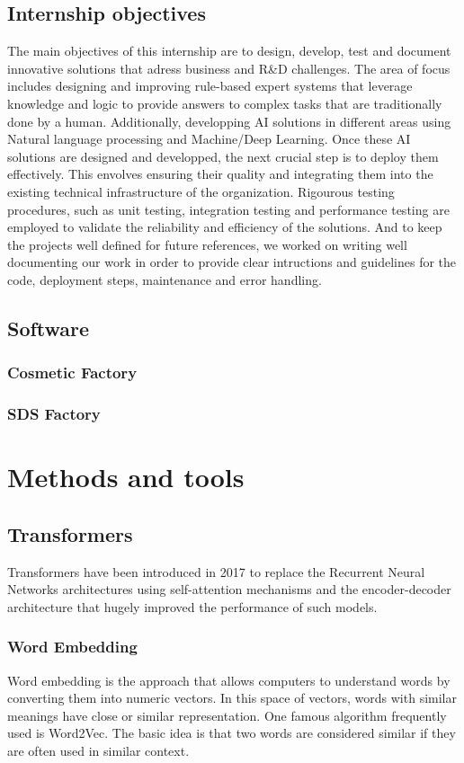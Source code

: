 \documentclass[a4paper,12pt,twoside]{report}
\begin{document}
\section{Internship objectives}
The main objectives of this internship are to design, develop, test and document innovative solutions that adress business and R\&D challenges. The area of focus includes designing and improving rule-based expert systems that leverage knowledge and logic to provide answers to complex tasks that are traditionally done by a human. Additionally, developping AI solutions in different areas using Natural language processing and Machine/Deep Learning. Once these AI solutions are designed and developped, the next crucial step is to deploy them effectively. This envolves ensuring their quality and integrating them into the existing technical infrastructure of the organization. Rigourous testing procedures, such as unit testing, integration testing and performance testing are employed to validate the reliability and efficiency of the solutions. And to keep the projects well defined for future references, we worked on writing well documenting our work in order to provide clear intructions and guidelines for the code, deployment steps, maintenance and error handling.

\section{Software}
\subsection{Cosmetic Factory}
\subsection{SDS Factory}
\chapter{Methods and tools}
\thispagestyle{empty}
\section{Transformers}
Transformers\cite{NIPS2017_3f5ee243} have been introduced in 2017 to replace the Recurrent Neural Networks architectures using self-attention mechanisms and the encoder-decoder architecture that hugely improved the performance of such models.

\subsection{Word Embedding}
Word embedding is the approach that allows computers to understand words by converting them into numeric vectors. In this space of vectors, words with similar meanings have close or similar representation. One famous algorithm frequently used is Word2Vec\cite{mikolov2013efficient}. The basic idea is that two words are considered similar if they are often used in similar context.
\end{document}
